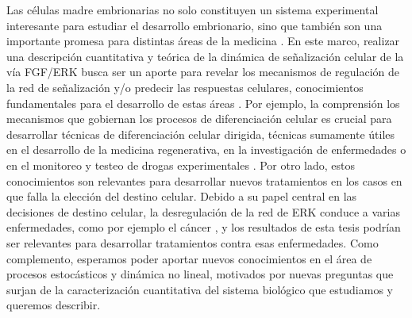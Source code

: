 \documentclass[./main.tex]{subfiles}
\begin{document}
Las células madre embrionarias no solo constituyen un sistema experimental interesante para estudiar el desarrollo embrionario, sino que también son una importante promesa para distintas áreas de la medicina \cite{Garreta2021,Waisman2019}. En este marco, realizar una descripción cuantitativa y teórica de la dinámica de señalización celular de la vía FGF/ERK busca ser un aporte para revelar los mecanismos de regulación de la red de señalización y/o predecir las respuestas celulares, conocimientos fundamentales para el desarrollo de estas áreas \cite{Shankaran2009}. Por ejemplo, la comprensión los mecanismos que gobiernan los procesos de diferenciación celular es crucial para desarrollar técnicas de diferenciación celular dirigida, técnicas sumamente útiles en el desarrollo de la medicina regenerativa, en la investigación de enfermedades o en el monitoreo y testeo de drogas experimentales \cite{Keller2005,Inoue2014}. Por otro lado, estos conocimientos son relevantes para desarrollar nuevos tratamientos en los casos en que falla la elección del destino celular. Debido a su papel central en las decisiones de destino celular, la desregulación de la red de ERK conduce a varias enfermedades, como por ejemplo el cáncer \cite{Dessauges2022,Bugaj2018,Lavoie2020,Grieco2013}, y los resultados de esta tesis podrían ser relevantes para desarrollar tratamientos contra esas enfermedades. Como complemento, esperamos poder aportar nuevos conocimientos en el área de procesos estocásticos y dinámica no lineal, motivados por nuevas preguntas que surjan de la caracterización cuantitativa del sistema biológico que estudiamos y queremos describir.

 
\end{document}
